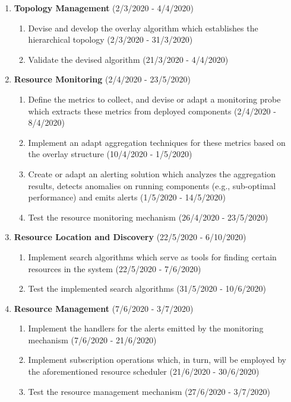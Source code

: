 \begin{enumerate}
    \item \textbf{Topology Management} (2/3/2020 - 4/4/2020)
    \begin{enumerate}
        \item Devise and develop the overlay algorithm which establishes the hierarchical topology (2/3/2020 - 31/3/2020)
        \item Validate the devised algorithm (21/3/2020 - 4/4/2020)
    \end{enumerate}
    \item \textbf{Resource Monitoring} (2/4/2020 - 23/5/2020)
    \begin{enumerate}
        \item Define the metrics to collect, and devise or adapt a monitoring probe which extracts these metrics from deployed components (2/4/2020 - 8/4/2020)
        \item Implement an adapt aggregation techniques for these metrics based on the overlay structure (10/4/2020 - 1/5/2020)
        \item Create or adapt an alerting solution which analyzes the aggregation results, detects anomalies on running components (e.g., sub-optimal performance) and emits alerts (1/5/2020 - 14/5/2020)
        \item Test the resource monitoring mechanism (26/4/2020 - 23/5/2020)
    \end{enumerate}
    \item \textbf{Resource Location and Discovery} (22/5/2020 - 6/10/2020)
    \begin{enumerate}
        \item Implement search algorithms which serve as tools for finding certain resources in the system (22/5/2020 - 7/6/2020)
        \item Test the implemented search algorithms (31/5/2020 - 10/6/2020)
    \end{enumerate}
    \item \textbf{Resource Management} (7/6/2020 - 3/7/2020)
    \begin{enumerate}
        \item Implement the handlers for the alerts emitted by the monitoring mechanism (7/6/2020 - 21/6/2020)
        \item Implement subscription operations which, in turn, will be employed by the aforementioned resource scheduler (21/6/2020 - 30/6/2020)
        \item Test the resource management mechanism (27/6/2020 - 3/7/2020)

\end{enumerate}
\end{enumerate}
